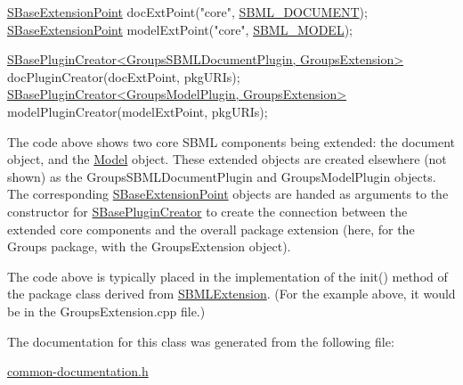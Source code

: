 \begin{DoxyCode}
\hyperlink{class_s_base_extension_point}{SBaseExtensionPoint} docExtPoint(\textcolor{stringliteral}{"core"}, \hyperlink{_s_b_m_l_type_codes_8h_aa283dddfd7671179362b2f38e2938cfeabfe976c674a5a708c1373dfdfa3bfa63}{SBML\_DOCUMENT});
\hyperlink{class_s_base_extension_point}{SBaseExtensionPoint} modelExtPoint(\textcolor{stringliteral}{"core"}, \hyperlink{_s_b_m_l_type_codes_8h_aa283dddfd7671179362b2f38e2938cfea3c866be107d7858b6dd1e978ed103028}{SBML\_MODEL});

\hyperlink{class_s_base_plugin_creator}{SBasePluginCreator<GroupsSBMLDocumentPlugin, GroupsExtension>}
       docPluginCreator(docExtPoint, pkgURIs);
\hyperlink{class_s_base_plugin_creator}{SBasePluginCreator<GroupsModelPlugin, GroupsExtension>}
       modelPluginCreator(modelExtPoint, pkgURIs);
\end{DoxyCode}


The code above shows two core S\+B\+ML components being extended\+: the document object, and the \hyperlink{class_model}{Model} object. These extended objects are created elsewhere (not shown) as the {\ttfamily Groups\+S\+B\+M\+L\+Document\+Plugin} and {\ttfamily Groups\+Model\+Plugin} objects. The corresponding \hyperlink{class_s_base_extension_point}{S\+Base\+Extension\+Point} objects are handed as arguments to the constructor for \hyperlink{class_s_base_plugin_creator}{S\+Base\+Plugin\+Creator} to create the connection between the extended core components and the overall package extension (here, for the Groups package, with the {\ttfamily Groups\+Extension} object).

The code above is typically placed in the implementation of the {\ttfamily init()} method of the package class derived from \hyperlink{class_s_b_m_l_extension}{S\+B\+M\+L\+Extension}. (For the example above, it would be in the {\ttfamily Groups\+Extension.\+cpp} file.) 

The documentation for this class was generated from the following file\+:\begin{DoxyCompactItemize}
\item 
\hyperlink{common-documentation_8h}{common-\/documentation.\+h}\end{DoxyCompactItemize}

